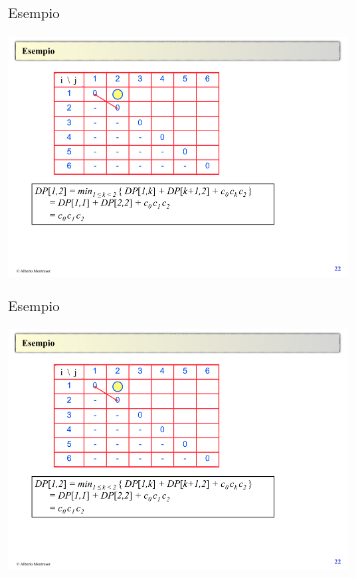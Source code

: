 \begin{frame}{Esempio}
\vspace{-12pt}
\begin{center}
\includegraphics[width=9cm,page=4]{moltmatrici.pdf}
\end{center}
\end{frame}

\begin{frame}{Esempio}
\vspace{-12pt}
\begin{center}
\includegraphics[width=9cm,page=5]{moltmatrici.pdf}
\end{center}
\end{frame}

